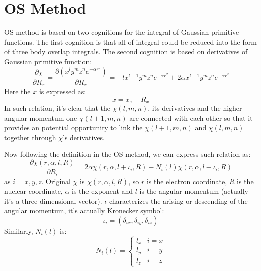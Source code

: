 % 
%
%
%
\section{OS Method}
%
%
%
%
OS method is based on two cognitions for the integral of Gaussian primitive
functions. The first cognition is that all of integral could be reduced into the
form of three body overlap integrals. The second cognition is based on
derivatives of Gaussian primitive function:
\begin{equation}
 \label{OS_general_int_eq:1}
\frac{\partial \chi}{\partial R_{x}} = \frac{\partial
(x^{l}y^{m}z^{n}e^{-\alpha r^{2}})}
{\partial R_{x}} =  -lx^{l-1}y^{m}z^{n}e^{-\alpha r^{2}} + 2\alpha
x^{l+1}y^{m}z^{n}e^{-\alpha r^{2}}
\end{equation}
Here the $x$ is expressed as:
\begin{equation}
 x = x_{e} - R_{x} 
\end{equation}
In such relation, it's clear that the $\chi(l,m,n)$, its derivatives and the
higher angular momentum one $\chi(l+1,m,n)$ are connected with each other so
that it provides an potential opportunity to link the $\chi(l+1,m,n)$
and $\chi(l,m,n)$ together through $\chi$'s derivatives.

Now following the definition in the OS method, we can express such 
relation as:
\begin{equation}
 \label{OS_general_int_eq:2}
 \frac{\partial \chi(r,\alpha,l,R)}{\partial R_{i}} = 
2\alpha\chi(r,\alpha,l+\iota_{i},R) - N_{i}(l)\chi(r,\alpha,l-\iota_{i},R)
\end{equation}
as $i = x, y, z$. Original $\chi$ is $\chi(r,\alpha,l,R)$, so $r$ is the
electron coordinate, $R$ is the nuclear coordinate, $\alpha$ is the exponent
and $l$ is the angular momentum (actually it's a three dimensional vector).
$\iota$ characterizes the arising or descending of the angular momentum,
it's actually Kronecker symbol:
\begin{equation}
 \iota_{i} = (\delta_{ix}, \delta_{iy}, \delta_{iz})
\label{OS_general_int_eq:3}
\end{equation}
Similarly, $N_{i}(l)$ is:
\begin{equation}
N_{i}(l) = 
\begin{cases}
 l_{x} & i = x \\
 l_{y} & i = y \\
 l_{z} & i = z 
\end{cases}
 \label{OS_general_int_eq:4}
\end{equation}

